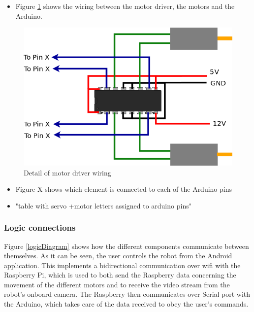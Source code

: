 	\bigskip
	\begin{itemize}
	\item Figure \ref{hbridgeDetail} shows the wiring between the motor driver, the motors and the Arduino.
	\end{itemize}
	
	\begin{figure}[H]
			\centering
			\includegraphics[scale=0.5, angle=0]{images/Diagrams/hbridge.png}
			\caption{Detail of motor driver wiring }
			\label{hbridgeDetail}
	\end{figure}
	\bigskip

	\begin{itemize}
	\item Figure X shows which element is connected to each of the Arduino pins

	\item "table with servo +motor letters assigned to arduino pins"
	\end{itemize}



\subsubsection{Logic connections}

Figure \ref{logicDiagram} shows how the different components communicate between themselves. As it can be seen, the user controls the robot from the Android application. This implements a bidirectional communication over wifi with the Raspberry Pi, which is used to both send the Raspberry data concerning the movement of the different motors and to receive the video stream from the robot's onboard camera. The Raspberry then communicates over Serial port with the Arduino, which takes care of the data received to obey the user's commands.\\


